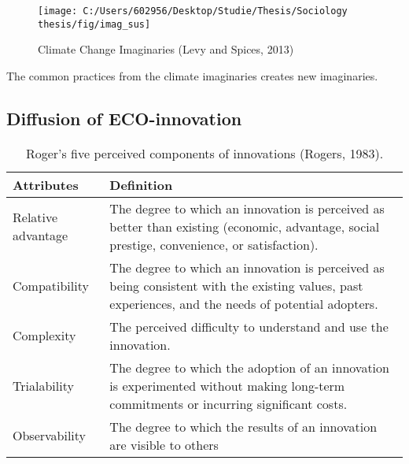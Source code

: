 \documentclass[man,floatsintext]{apa6}
\begin{document}
\begin{figure}

{\centering \texttt{[image: C:/Users/602956/Desktop/Studie/Thesis/Sociology thesis/fig/imag\_sus]} 

}

\caption{ Climate Change Imaginaries (Levy and Spices, 2013) }\label{fig:clim}
\end{figure}

The common practices from the climate imaginaries creates new
imaginaries.

\subsection{Diffusion of
ECO-innovation}\label{diffusion-of-eco-innovation}

\begin{table}[t]

\caption{\label{tab:diff}Roger's five perceived components of innovations (Rogers, 1983).}
\centering
\fontsize{9}{11}\selectfont
\begin{tabular}{>{}l>{\raggedright\arraybackslash}p{30em}}
\toprule
Attributes & Definition\\
\midrule
Relative advantage & The degree to which an innovation is perceived as better than existing (economic,  advantage, social prestige, convenience, or satisfaction).\\
Compatibility & The degree to which an innovation is perceived as being consistent with the existing values, past experiences, and the needs of potential adopters.\\
Complexity & The perceived difficulty to understand and use the innovation.\\
Trialability & The degree to which the adoption of an innovation is experimented without making long-term commitments or incurring significant costs.\\
Observability & The degree to which the results of an innovation are visible to others\\
\bottomrule
\end{tabular}
\end{table}
\end{document}
